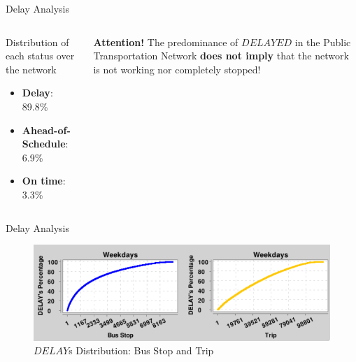 \documentclass[xcolor=dvipsnames,table]{beamer}
\begin{document}
\begin{frame}{Delay Analysis}
        \begin{columns}
                \begin{block}{Distribution of each status over the network}
                        \begin{itemize}
                                \item \textbf{Delay}: 89.8\% 
                                \item \textbf{Ahead-of-Schedule}: 6.9\% 
                                \item \textbf{On time}: 3.3\%
                        \end{itemize}
                \end{block}
                \centering
                \begin{block}{\textbf{Attention!}}
                        The predominance of $DELAYED$ in the Public Transportation Network \textbf{does not imply} that the network is not working
nor completely stopped!
                \end{block}
        \end{columns}
\end{frame}
\begin{frame}{Delay Analysis}
        \begin{figure}[H]
                \centering
                \includegraphics[width=\textwidth]{images/delays_distribution.png}
                \caption{$DELAY$s Distribution: Bus Stop and Trip}
        \end{figure}
\end{frame}
\end{document}
